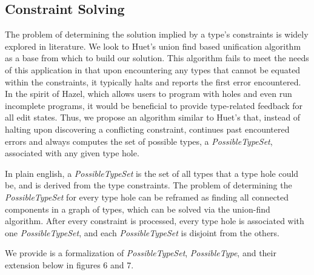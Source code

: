 
\usetikzlibrary{positioning,calc}

\subsection{Constraint Solving}
\label{sec:infalg}
The problem of determining the solution implied by a type's constraints is widely explored in literature. We look to Huet's union find based unification algorithm \cite{G. Huet} as a base from which to build our solution. This algorithm fails to meet the needs of this application in that upon encountering any types that cannot be equated within the constraints, it typically halts and reports the first error encountered.
In the spirit of Hazel, which allows users to program with holes and even run incomplete programs, it would be beneficial to provide type-related feedback for all edit states. Thus, we propose an algorithm similar to Huet's that, instead of halting upon discovering a conflicting constraint, continues past encountered errors and always computes the set of possible types, a \textit{PossibleTypeSet}, associated with any given type hole.

In plain english, a \textit{PossibleTypeSet} is the set of all types that a type hole could be, and is derived from the type constraints. The problem of determining the \textit{PossibleTypeSet} for every type hole can be reframed as finding all connected components in a graph of types, which can be solved via the union-find algorithm. After every constraint is processed, every type hole is associated with one \textit{PossibleTypeSet}, and each \textit{PossibleTypeSet} is disjoint from the others.

We provide is a formalization of \textit{PossibleTypeSet}, \textit{PossibleType}, and their extension below in figures 6 and 7.

